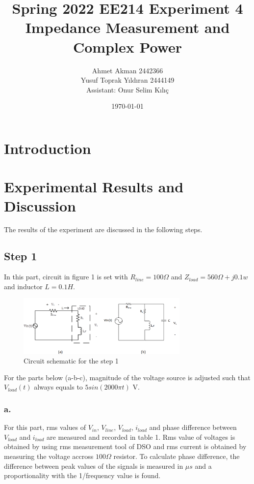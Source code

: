 \documentclass[letterpaper,12pt]{article}
\begin{document}
\thispagestyle{empty}

\title{Spring 2022 EE214 Experiment 4  \protect\\ Impedance Measurement and Complex Power}
\author{Ahmet Akman 2442366 \protect\\ Yusuf Toprak Yıldıran 2444149 \protect\\ Assistant: Onur Selim Kılıç}
\date{\today}
\maketitle
\tableofcontents
\section{Introduction}
\section{Experimental Results and Discussion}
The results of the experiment are discussed in the following steps.
%
\subsection{Step 1}

In this part, circuit in figure 1 is set with \(R_{line}= 100\Omega\) and \(Z_{load}= 560\Omega + j0.1w\) and inductor \(L= 0.1H\).
\begin{figure}[H]
    \centering
    \includegraphics[width = 0.75\textwidth]{1SCH.png}
    \caption{Circuit schematic for the step 1}
\end{figure} 
For the parts below (a-b-c), magnitude of the voltage source is adjusted such that \(V_{load}(t)\) always equals to \(5sin(2000\pi t)\) V. 

\subsubsection{a.}
For this part, rms values of \(V_{in}\), \(V_{line}\), \(V_{load}\), \(i_{load}\) and phase difference between \(V_{load}\) and \(i_{load}\) are measured and recorded in table 1. Rms value of voltages is obtained by using rms measurement tool of DSO and rms current is obtained by measuring the voltage accross \(100\Omega\) resistor. To calculate phase difference, the difference between peak values of the signals is measured in \(\mu s\) and a proportionality with the 1/frequency value is found.
\end{document}
